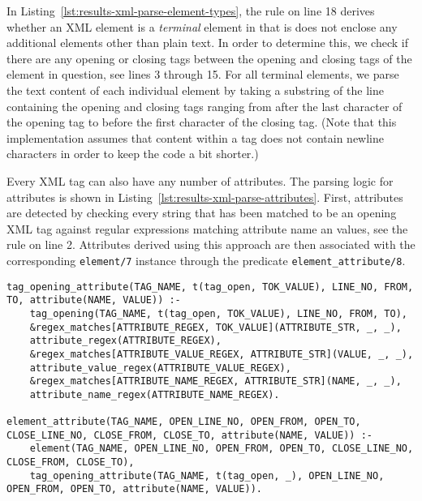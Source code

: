 In Listing~\ref{lst:results-xml-parse-element-types}, the rule on line 18 derives whether an XML element is a \emph{terminal} element in that is does not enclose any additional elements other than plain text. In order to determine this, we check if there are any opening or closing tags between the opening and closing tags of the element in question, see lines 3 through 15. For all terminal elements, we parse the text content of each individual element by taking a substring of the line containing the opening and closing tags ranging from after the last character of the opening tag to before the first character of the closing tag. (Note that this implementation assumes that content within a tag does not contain newline characters in order to keep the code a bit shorter.)

Every XML tag can also have any number of attributes. The parsing logic for attributes is shown in Listing~\ref{lst:results-xml-parse-attributes}. First, attributes are detected by checking every string that has been matched to be an opening XML tag against regular expressions matching attribute name an values, see the rule on line 2. Attributes derived using this approach are then associated with the corresponding \texttt{element/7} instance through the predicate \texttt{element\_attribute/8}. 

\begin{lstlisting}[style=asp-code, label={lst:results-xml-parse-attributes}, caption={Parsing XML attributes.}]
%% Extract attributes
tag_opening_attribute(TAG_NAME, t(tag_open, TOK_VALUE), LINE_NO, FROM, TO, attribute(NAME, VALUE)) :-
	tag_opening(TAG_NAME, t(tag_open, TOK_VALUE), LINE_NO, FROM, TO),
	&regex_matches[ATTRIBUTE_REGEX, TOK_VALUE](ATTRIBUTE_STR, _, _),
	attribute_regex(ATTRIBUTE_REGEX),
	&regex_matches[ATTRIBUTE_VALUE_REGEX, ATTRIBUTE_STR](VALUE, _, _), 
	attribute_value_regex(ATTRIBUTE_VALUE_REGEX),
	&regex_matches[ATTRIBUTE_NAME_REGEX, ATTRIBUTE_STR](NAME, _, _),
	attribute_name_regex(ATTRIBUTE_NAME_REGEX).

element_attribute(TAG_NAME, OPEN_LINE_NO, OPEN_FROM, OPEN_TO, CLOSE_LINE_NO, CLOSE_FROM, CLOSE_TO, attribute(NAME, VALUE)) :-
	element(TAG_NAME, OPEN_LINE_NO, OPEN_FROM, OPEN_TO, CLOSE_LINE_NO, CLOSE_FROM, CLOSE_TO),
	tag_opening_attribute(TAG_NAME, t(tag_open, _), OPEN_LINE_NO, OPEN_FROM, OPEN_TO, attribute(NAME, VALUE)).
\end{lstlisting} 

